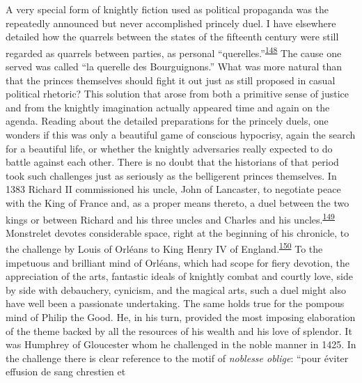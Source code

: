 A very special form of knightly fiction used as political propaganda was
the repeatedly announced but never accomplished princely duel. I have
elsewhere detailed how the quarrels between the states of the fifteenth
century were still regarded as quarrels between parties, as personal
``querelles.''\textsuperscript{\protect\hypertarget{10_Chapter_Three__THE_HEROIC_DREAM.xhtmlux5cux23id_1639}{\protect\hyperlink{23_NOTES.xhtmlux5cux23id_1640}{148}}}
The cause one served was called ``la querelle des Bourguignons.'' What
was more natural than that the princes themselves should fight it out
just as still proposed in casual political rhetoric? This solution that
arose from both a primitive sense of justice and from the knightly
imagination actually appeared time and again on the agenda. Reading
about the detailed preparations for the princely duels, one wonders if
this was only a beautiful game of conscious hypocrisy, again the search
for a beautiful life, or whether the knightly adversaries really
expected to do battle against each other. There is no doubt that the
historians of that period took such challenges just as seriously as the
belligerent princes themselves. In 1383 Richard II commissioned his
uncle, John of Lancaster, to negotiate peace with the King of France
and, as a proper means thereto, a duel between the two kings or between
Richard and his three uncles and Charles and his
uncles.\textsuperscript{\protect\hypertarget{10_Chapter_Three__THE_HEROIC_DREAM.xhtmlux5cux23id_1637}{\protect\hyperlink{23_NOTES.xhtmlux5cux23id_1638}{149}}}
Monstrelet devotes considerable space, right at the beginning of his
chronicle, to the challenge by Louis of Orléans to King Henry
\protect\hypertarget{10_Chapter_Three__THE_HEROIC_DREAM.xhtmlux5cux23page_108}{}{}IV
of
England.\textsuperscript{\protect\hypertarget{10_Chapter_Three__THE_HEROIC_DREAM.xhtmlux5cux23id_1635}{\protect\hyperlink{23_NOTES.xhtmlux5cux23id_1636}{150}}}
To the impetuous and brilliant mind of Orléans, which had scope for
fiery devotion, the appreciation of the arts, fantastic ideals of
knightly combat and courtly love, side by side with debauchery,
cynicism, and the magical arts, such a duel might also have well been a
passionate undertaking. The same holds true for the pompous mind of
Philip the Good. He, in his turn, provided the most imposing elaboration
of the theme backed by all the resources of his wealth and his love of
splendor. It was Humphrey of Gloucester whom he challenged in the noble
manner in 1425. In the challenge there is clear reference to the motif
of \emph{noblesse oblige}: ``pour éviter effusion de sang chrestien et
